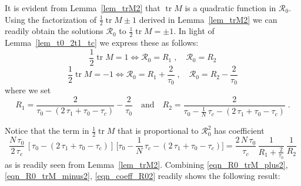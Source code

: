 \documentclass{amsart}
\theoremstyle{plain} %
\begin{document}
It is evident from Lemma~\ref{lem_trM2} that $\operatorname{tr} M$ is a quadratic
function in ${\mathcal R}_0$.
Using the factorization of $\frac{1}{2} \operatorname{tr} M \pm 1$
derived in Lemma~\ref{lem_trM2}
we can readily obtain the solutions ${\mathcal R}_0$ to
$\frac{1}{2} \operatorname{tr} M = \pm 1$.
In light of Lemma~\ref{lem_t0_2t1_tc}
we express these as follows:
\begin{equation}
  \label{eqn_R0_trM_plus2}
  \frac{1}{2} \operatorname{tr} M = 1
  \iff
  {\mathcal R}_0
  =
  R_1
  \;,\quad
  {\mathcal R}_0
  =
  R_2
\end{equation}
\begin{equation}
  \label{eqn_R0_trM_minus2}
  \frac{1}{2}\operatorname{tr} M = -1
  \iff
  {\mathcal R}_0
  =
  R_1 + \frac{2}{\tau_0}
  \;,\quad
  {\mathcal R}_0
  =
  R_2
  -
  \frac{2}{\tau_0}
\end{equation}
where we set
\begin{equation*}
  R_1
  =
  \frac{2}{ \tau_0 - (2\,\tau_1 + \tau_0 - \tau_c) }
  -
  \frac{2}{\tau_0}
  \quad\text{and}\quad
  R_2
  =
  \frac{2
  }{
  \tau_0 - \frac{1}{N}\,\tau_c
  -
  (2\,\tau_1 + \tau_0 - \tau_c)
  }
  \;.
\end{equation*}

Notice that the term in $\frac{1}{2}\operatorname{tr} M$
that is proportional to ${\mathcal R}_0^2$ has coefficient
\begin{equation}
  \label{eqn_coeff_R02}
  \frac{N \,\tau_0 }{2\,\tau_c}
  \,[ \tau_0 - ( 2\,\tau_1 + \tau_0 - \tau_c ) ]
  \,\Big[
  \tau_0
  -
  \frac{1}{N}\,\tau_c
  -
  ( 2\,\tau_1 + \tau_0 - \tau_c )
  \Big]
  =
  \frac{2\,N \,\tau_0 }{\tau_c}
  \,\frac{1}{R_1 + \frac{2}{\tau_0}}
  \,\frac{1}{R_2}
\end{equation}
as is readily seen from Lemma~\ref{lem_trM2}.
Combining
\eqref{eqn_R0_trM_plus2}, \eqref{eqn_R0_trM_minus2}, \eqref{eqn_coeff_R02}
readily shows the following result:
\end{document}
